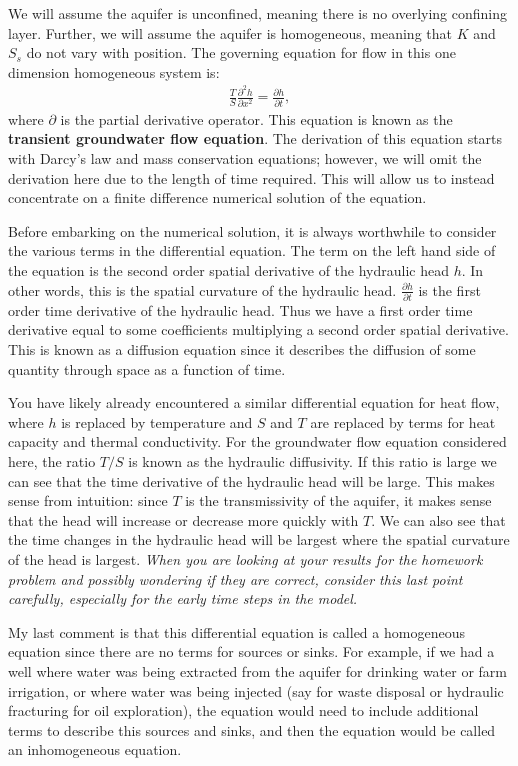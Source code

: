 \documentclass[11pt, oneside]{article}   	%
\begin{document}
We will assume the aquifer is unconfined, meaning there is no overlying confining layer. Further, we will assume the aquifer is homogeneous, meaning that $K$ and $S_s$ do not vary with position. The governing equation for flow in this one dimension homogeneous system is:
\begin{eqnarray}
\frac{T}{S} \frac{\partial^2 h}{\partial x^2} = \frac{\partial h}{\partial t},
\label{transient}
\end{eqnarray}
where $\partial$ is the partial derivative operator. This equation is known as the {\bf transient groundwater flow equation}. The derivation of this equation starts with Darcy's law and mass conservation equations; however, we will omit the derivation here due to the length of time required. This will allow us to instead concentrate on a finite difference numerical solution of the equation.

Before embarking on the numerical solution, it is always worthwhile to consider the various terms in the differential equation. The term on the left hand side of the equation is the second order spatial derivative of the hydraulic head $h$. In other words, this is the spatial curvature of the hydraulic head. $ \frac{\partial h}{\partial t}$ is the first order time derivative of  the hydraulic head. Thus we have a first order time derivative equal to some coefficients multiplying  a second order spatial derivative. This is known as a diffusion equation since it describes the diffusion of some quantity through space as a function of time.


You have likely already encountered a similar differential equation for heat flow, where $h$  is replaced by temperature and $S$ and $T$ are replaced by terms for heat capacity and thermal conductivity. For the groundwater flow equation considered here, the ratio $T/S$ is known as the hydraulic diffusivity.  If this ratio is large we can see that the time derivative of the hydraulic head will be large.  This makes sense from intuition: since $T$ is the transmissivity of the aquifer, it makes sense that the head will increase or decrease more quickly with $T$.  We can also see that the time changes in the hydraulic head will be largest where the spatial curvature of the head is largest.  {\it When you are looking at your results for the homework problem and possibly wondering if they are correct, consider this last point carefully, especially for the early time steps in the model.}

My last comment is that this differential equation is called a homogeneous equation since there are no terms for sources or sinks. For example, if we had a well where water was being extracted from the aquifer for drinking water or farm irrigation, or where water was being injected (say for waste disposal or hydraulic fracturing for oil exploration), the equation would need to include  additional terms to describe this sources and sinks, and then the equation would be called an inhomogeneous equation. 
\end{document}

